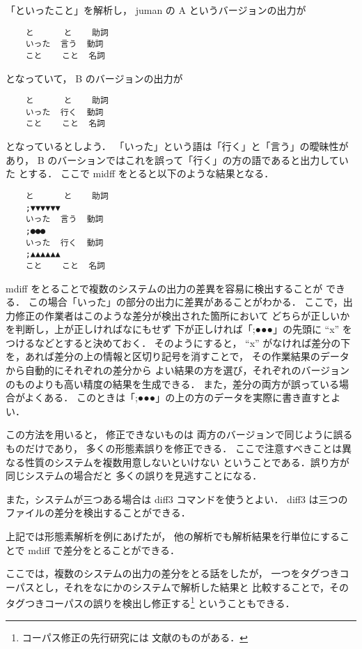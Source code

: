 「といったこと」を解析し，
juman の A というバージョンの出力が
\begin{verbatim}
    と      と    助詞
    いった  言う  動詞
    こと    こと  名詞
\end{verbatim}
となっていて，
B のバージョンの出力が
\begin{verbatim}
    と      と    助詞
    いった  行く  動詞
    こと    こと  名詞
\end{verbatim}
となっているとしよう．
「いった」という語は「行く」と「言う」の曖昧性があり，
B のバーションではこれを誤って「行く」の方の語であると出力していた
とする．
ここで midff をとると以下のような結果となる．
\begin{verbatim}
    と      と    助詞
    ;▼▼▼▼▼▼
    いった  言う  動詞
    ;●●●
    いった  行く  動詞
    ;▲▲▲▲▲▲
    こと    こと  名詞
\end{verbatim}
mdiff をとることで複数のシステムの出力の差異を容易に検出することが
できる．
この場合「いった」の部分の出力に差異があることがわかる．
ここで，出力修正の作業者はこのような差分が検出された箇所において
どちらが正しいかを判断し，上が正しければなにもせず
下が正しければ「;●●●」の先頭に ``x'' をつけるなどとすると決めておく．
そのようにすると，
``x'' がなければ差分の下を，あれば差分の上の情報と区切り記号を消すことで，
その作業結果のデータから自動的にそれぞれの差分から
よい結果の方を選び，それぞれのバージョンのものよりも高い精度の結果を生成できる．
また，差分の両方が誤っている場合がよくある．
このときは「;●●●」の上の方のデータを実際に書き直すとよい．

この方法を用いると，
修正できないものは
両方のバージョンで同じように誤るものだけであり，
多くの形態素誤りを修正できる．
ここで注意すべきことは異なる性質のシステムを複数用意しないといけない
ということである．誤り方が同じシステムの場合だと
多くの誤りを見逃すことになる．

また，システムが三つある場合は diff3 コマンドを使うとよい．
diff3 は三つのファイルの差分を検出することができる．

上記では形態素解析を例にあげたが，
他の解析でも解析結果を行単位にすることで mdiff で差分をとることができる．

ここでは，複数のシステムの出力の差分をとる話をしたが，
一つをタグつきコーパスとし，それをなにかのシステムで解析した結果と
比較することで，そのタグつきコーパスの誤りを検出し修正する\footnote{コーパス修正の先行研究には
文献のもの\cite{murata2000_3_nl,NLP2001}がある．}
ということもできる．

